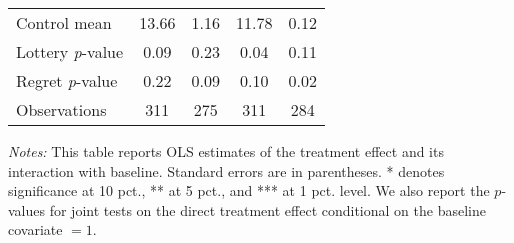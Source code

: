 \begin{table}[htbp]
{\begin{threeparttable}
\begin{tabular}{l*{4}{c}}
Control mean    &    13.66         &     1.16         &    11.78         &     0.12         \\
Lottery \emph{p}-value&     0.09         &     0.23         &     0.04         &     0.11         \\
Regret \emph{p}-value&     0.22         &     0.09         &     0.10         &     0.02         \\
Observations    &      311         &      275         &      311         &      284         \\
\bottomrule \end{tabular} \begin{tablenotes}[flushleft] \footnotesize \item \emph{Notes:} This table reports OLS estimates of the treatment effect and its interaction with baseline. Standard errors are in parentheses. * denotes significance at 10 pct., ** at 5 pct., and *** at 1 pct. level. We also report the \(p\)-values for joint tests on the direct treatment effect conditional on the baseline covariate $= 1$. \end{tablenotes} \end{threeparttable} } \end{table}
